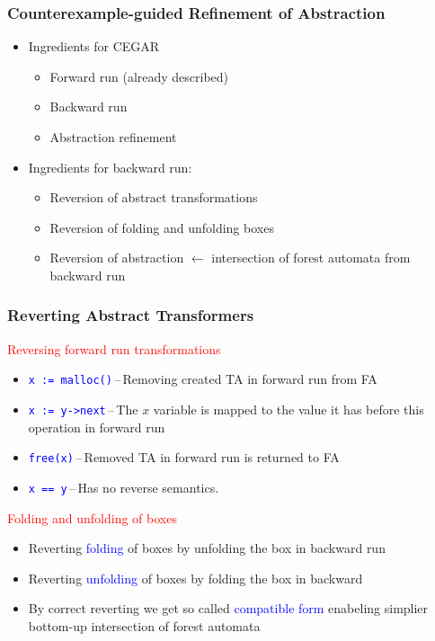 \documentclass{beamer}
\newcommand{\hlbl}[1]{\textcolor{blue}{#1}}
\newcommand{\hlgr}[1]{\textcolor{olive!50!green}{#1}}
\newcommand{\hlrd}[1]{\textcolor{red}{#1}}
\begin{document}
\begin{frame}
\frametitle{Counterexample-guided Refinement of Abstraction}

	\begin{itemize}
		\item \hlgr{Ingredients for CEGAR}
		\begin{itemize}
			\item Forward run (already described)
			\item Backward run
			\item Abstraction refinement
		\end{itemize}
		\item \hlgr{Ingredients for backward run}:
		\begin{itemize}
			\item Reversion of abstract transformations
			\item Reversion of folding and unfolding boxes
			\item Reversion of abstraction $\leftarrow$ intersection of forest automata
				from backward run
		\end{itemize}
	\end{itemize}

\end{frame}


\begin{frame}
\frametitle{Reverting Abstract Transformers}
	\hlrd{Reversing forward run transformations}
	\begin{itemize}
		\item \hlbl{\texttt{x := malloc()}}\,--\,Removing created TA in forward run from FA
		\item \hlbl{\texttt{x := y->next}}\,--\,The $x$ variable is mapped to the value it has
			before this operation in forward run
		\item \hlbl{\texttt{free(x)}}\,--\,Removed TA in forward run is returned to FA
		\item \hlbl{\texttt{x == y}}\,--\,Has no reverse semantics.
	\end{itemize}

	\hlrd{Folding and unfolding of boxes}
	\begin{itemize}
		\item Reverting \hlbl{folding} of boxes by unfolding the box
			in backward run
		\item Reverting \hlbl{unfolding} of boxes by folding the box
			in backward
		\item By correct reverting we get so called \hlbl{compatible form}
			enabeling simplier bottom-up intersection of forest automata
	\end{itemize}

\end{frame}
\end{document}
